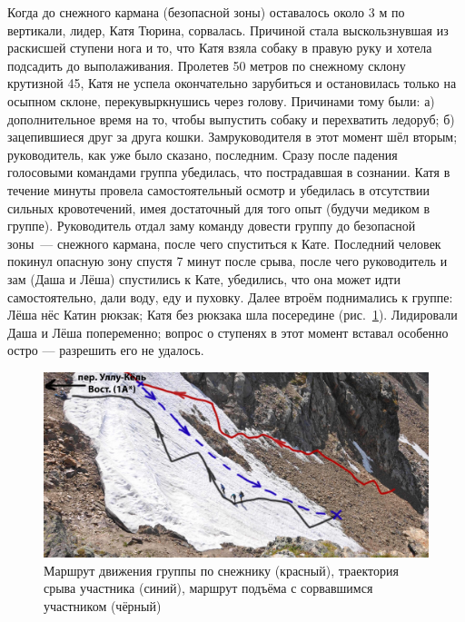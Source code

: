 Когда до снежного кармана (безопасной зоны) оставалось около 3 м по вертикали, лидер, Катя Тюрина, сорвалась. Причиной стала выскользнувшая из раскисшей ступени нога и то, что Катя взяла собаку в правую руку и хотела подсадить до выполаживания. Пролетев 50 метров по снежному склону крутизной 45\degree, Катя не успела окончательно зарубиться и остановилась только на осыпном склоне, перекувыркнушись через голову. Причинами тому были: а) дополнительное время на то, чтобы выпустить собаку и перехватить ледоруб; б) зацепившиеся друг за друга кошки. Замруководителя в этот момент шёл вторым; руководитель, как уже было сказано, последним. Сразу после падения голосовыми командами группа убедилась, что пострадавшая в сознании. Катя в течение минуты провела самостоятельный осмотр и убедилась в отсутствии сильных кровотечений, имея достаточный для того опыт (будучи медиком в группе). Руководитель отдал заму команду довести группу до безопасной зоны~--- снежного кармана, после чего спуститься к Кате. Последний человек покинул опасную зону спустя 7 минут после срыва, после чего руководитель и зам (Даша и Лёша) спустились к Кате, убедились, что она может идти самостоятельно, дали воду, еду и пуховку. Далее втроём поднимались к группе: Лёша нёс Катин рюкзак; Катя без рюкзака шла посередине (рис.~\ref{fig:DSC_0946}). Лидировали Даша и Лёша попеременно; вопрос о ступенях в этот момент вставал особенно остро --- разрешить его не удалось. 
\begin{figure}[h!]
	\centering
	\includegraphics[width=0.7\linewidth]{../pics/DSC_0946.jpg}
	\caption{Маршрут движения группы по снежнику (красный), траектория срыва участника (синий), маршрут подъёма с сорвавшимся участником (чёрный)}
	\label{fig:DSC_0946}
\end{figure}

